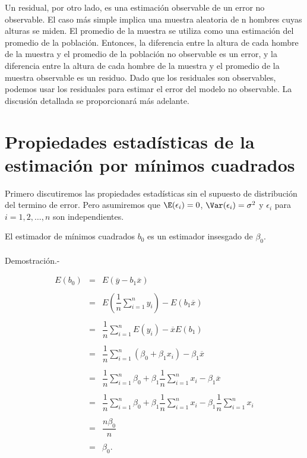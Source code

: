 Un residual, por otro lado, es una estimación observable de un error no observable. El caso más simple implica una muestra aleatoria de n hombres cuyas alturas se miden. El promedio de la muestra se utiliza como una estimación del promedio de la población. Entonces, la diferencia entre la altura de cada hombre de la muestra y el promedio de la población no observable es un error, y la diferencia entre la altura de cada hombre de la muestra y el promedio de la muestra observable es un residuo. Dado que los residuales son observables, podemos usar los residuales para estimar el error del modelo no observable. La discusión detallada se proporcionará más adelante.

\section{Propiedades estadísticas de la estimación por mínimos cuadrados}

Primero discutiremos las propiedades estadísticas sin el supuesto de distribución del termino de error. Pero asumiremos que $\E(\epsilon_i)=0$, $\Var(\epsilon_i)=\sigma^2$ y $\epsilon_i$ para $i=1,2,\ldots,n$ son independientes.\\


\begin{teo}
    El estimador de mínimos cuadrados $b_0$ es un estimador insesgado de $\beta_0$.\\\\

	Demostración.-\; 

	$$
	\begin{array}{rcl}
	    E(b_0) &=& E(\overline{y}-b_1\overline{x})\\\\
	    &=& E\left(\dfrac{1}{n}\displaystyle\sum_{i=1}^n y_i\right)-E\left(b_1\overline{x}\right)\\\\
		       &=& \dfrac{1}{n}\displaystyle\sum_{i=1}^n E(y_i)-\overline{x}E(b_1)\\\\
		   &=&\dfrac{1}{n}\displaystyle\sum_{i=1}^n (\beta_0+\beta_1x_i)-\beta_1\overline{x}\\\\
		   &=&\dfrac{1}{n} \displaystyle\sum_{i=1}^n \beta_0 + \beta_1 \dfrac{1}{n}\displaystyle\sum_{i=1}^nx_i-\beta_1\overline{x}\\\\
		   &=&\dfrac{1}{n} \displaystyle\sum_{i=1}^n \beta_0 + \beta_1 \dfrac{1}{n}\displaystyle\sum_{i=1}^nx_i-\beta_1\dfrac{1}{n}\displaystyle\sum_{i=1}^n x_i\\\\
		   &=& \dfrac{n\beta_0}{n}\\\\
		       &=&\beta_0.
	\end{array}
	$$
\end{teo}

